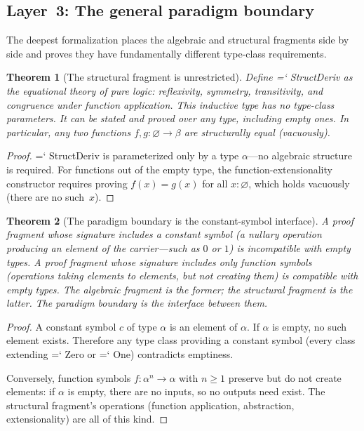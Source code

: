 \documentclass[11pt]{article}
\renewcommand{\texttt}[1]{%
  \begingroup\ttfamily\hyphenchar\font=`\-\relax
  \def\_{\textunderscore\discretionary{}{}{}}%
  #1\endgroup}
\newtheorem{theorem}{Theorem}
\theoremstyle{definition}
\theoremstyle{remark}
\begin{document}
\subsection{Layer~3: The general paradigm boundary}

The deepest formalization places the algebraic and structural
fragments side by side and proves they have fundamentally different
type-class requirements.

\begin{theorem}[The structural fragment is unrestricted]%
\label{thm:struct_unrestricted}
Define \texttt{StructDeriv} as the equational theory of pure logic:
reflexivity, symmetry, transitivity, and congruence under function
application.  This inductive type has \emph{no type-class parameters}.
It can be stated and proved over any type, including empty ones.
In particular, any two functions $f, g : \varnothing \to \beta$
are structurally equal (vacuously).
\end{theorem}

\begin{proof}
\texttt{StructDeriv} is parameterized only by a type
$\alpha$---no algebraic structure is required.  For functions out
of the empty type, the function-extensionality constructor
requires proving $f(x) = g(x)$ for all $x : \varnothing$, which
holds vacuously (there are no such~$x$).
\end{proof}

\begin{theorem}[The paradigm boundary is the constant-symbol interface]%
\label{thm:general_boundary}
A proof fragment whose signature includes a \emph{constant symbol}
(a nullary operation producing an element of the carrier---such as
$0$ or $1$) is incompatible with empty types.  A proof fragment
whose signature includes only \emph{function symbols} (operations
taking elements to elements, but not creating them) is compatible
with empty types.  The algebraic fragment is the former; the
structural fragment is the latter.  The paradigm boundary is
the interface between them.
\end{theorem}

\begin{proof}
A constant symbol $c$ of type $\alpha$ is an element of $\alpha$.
If $\alpha$ is empty, no such element exists.  Therefore any type
class providing a constant symbol (every class extending
\texttt{Zero} or \texttt{One}) contradicts emptiness.

Conversely, function symbols $f : \alpha^n \to \alpha$ with
$n \geq 1$ preserve but do not create elements: if $\alpha$ is
empty, there are no inputs, so no outputs need exist.  The
structural fragment's operations (function application, abstraction,
extensionality) are all of this kind.
\end{proof}
\end{document}

